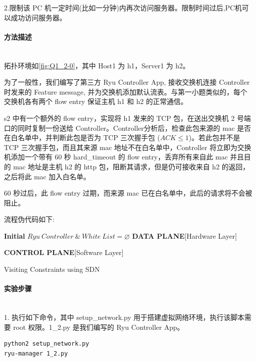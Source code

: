 \documentclass[format=draft,language=chinese,category=SDN]{hustreport}
\newcommand{\myparagraph}[1]{\paragraph{#1}\mbox{}\\}
\begin{document}
2.限制该 PC 机一定时间(比如一分钟)内再次访问服务器。限制时间过后,PC机可以成功访问服务器。

\myparagraph{方法描述}

拓扑环境如\autoref{fig:Q1_2-0}，其中 Host1 为 h1，Server1 为 h2。

为了一般性，我们编写了第三方 Ryu Controller App, 接收交换机连接 Controller 时发来的 Feature message, 并为交换机添加默认流表。与第一小题类似的，每个交换机各有两个 flow entry 保证主机 h1 和 h2 的正常通信。

s2 中有一个额外的 flow entry，实现将 h1 发来的 TCP 包，在送出交换机 2 号端口的同时复制一份送给 Controller。Controller分析后，检查此包来源的 mac 是否在白名单中，并判断此包是否为 TCP 三次握手包 ($ACK \leq 1$)。若此包并不是 TCP 三次握手包，而且其来源 mac 地址不在白名单中，Controller 将立即为交换机添加一个带有 60 秒 hard\_timeout 的 flow entry，丢弃所有来自此 mac 并且目的 mac 地址是主机 h2 的 http 包，阻断其请求，但是仍可接收来自 h2 的返回，之后将此 mac 加入白名单。

60 秒过后，此 flow entry 过期，而来源 mac 已在白名单中，此后的请求将不会被阻止。

流程伪代码如下:

\begin{algorithm}[H]
	\SetAlgoLined
	\textbf{Initial}  $Ryu~Controller~\&~White~List = \varnothing$ \;\label{alg_line:Q1_2DataPlane}
	\textbf{DATA PLANE}[Hardware Layer]\;

	\textbf{CONTROL PLANE}[Software Layer]\;
	\caption{Visiting Constraints using SDN}\label{alg:Q1_2}
\end{algorithm}

\myparagraph{实验步骤}

1. 执行如下命令，其中 setup\_network.py 用于搭建虚拟网络环境，执行该脚本需要 root 权限。1\_2.py 是我们编写的 Ryu Controller App。

\begin{lstlisting}
python2 setup_network.py
ryu-manager 1_2.py
\end{lstlisting}
\end{document}
